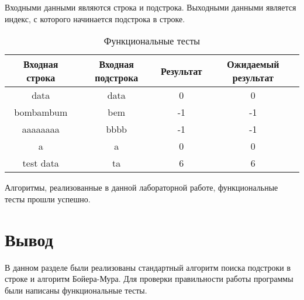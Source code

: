 Входными данными являются строка и подстрока. Выходными данными является индекс, с которого начинается подстрока в строке.
\begin{table}[h]
	\begin{center}
		\caption{\label{tbl:test} Функциональные тесты}
		\begin{tabular}{|c|c|c|c|}
			\hline
			Входная строка & Входная подстрока & Результат & Ожидаемый результат\\ 
			\hline
			data & data  & 0 & 0\\ \hline
			bombambum & bem & -1 & -1\\ \hline
			aaaaaaaa  & bbbb  & -1 & -1\\ \hline
			a &  a & 0 & 0\\ \hline
			test data  & ta & 6 & 6\\
			\hline
		\end{tabular}
	\end{center}
\end{table}

Алгоритмы, реализованные в данной лабораторной работе, функциональные тесты прошли успешно.

\section*{Вывод}

В данном разделе были реализованы стандартный алгоритм поиска подстроки в строке и алгоритм Бойера-Мура. 
Для проверки правильности работы программы были написаны функциональные тесты.
